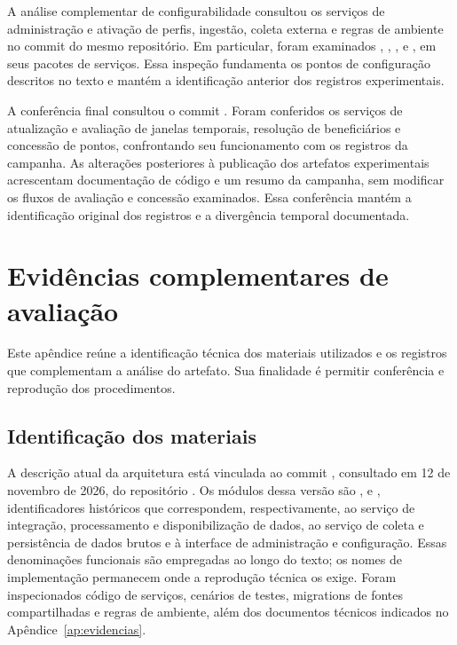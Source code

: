 \documentclass[tcc,capa]{texufpel}
\begin{document}
A análise complementar de configurabilidade consultou os serviços de administração e ativação de perfis, ingestão, coleta externa e regras de ambiente no commit  do mesmo repositório. Em particular, foram examinados , , ,  e , em seus pacotes de serviços. Essa inspeção fundamenta os pontos de configuração descritos no texto e mantém a identificação anterior dos registros experimentais.

A conferência final consultou o commit . Foram conferidos os serviços de atualização e avaliação de janelas temporais, resolução de beneficiários e concessão de pontos, confrontando seu funcionamento com os registros da campanha. As alterações posteriores à publicação dos artefatos experimentais acrescentam documentação de código e um resumo da campanha, sem modificar os fluxos de avaliação e concessão examinados. Essa conferência mantém a identificação original dos registros e a divergência temporal documentada.

\section{Evidências complementares de avaliação}
Este apêndice reúne a identificação técnica dos materiais utilizados e os registros que complementam a análise do artefato. Sua finalidade é permitir conferência e reprodução dos procedimentos.

\subsection{Identificação dos materiais}
A descrição atual da arquitetura está vinculada ao commit , consultado em 12 de novembro de 2026, do repositório . Os módulos dessa versão são ,  e , identificadores históricos que correspondem, respectivamente, ao serviço de integração, processamento e disponibilização de dados, ao serviço de coleta e persistência de dados brutos e à interface de administração e configuração. Essas denominações funcionais são empregadas ao longo do texto; os nomes de implementação permanecem onde a reprodução técnica os exige. Foram inspecionados código de serviços, cenários de testes, migrations de fontes compartilhadas e regras de ambiente, além dos documentos técnicos indicados no Apêndice~\ref{ap:evidencias}.
\end{document}
